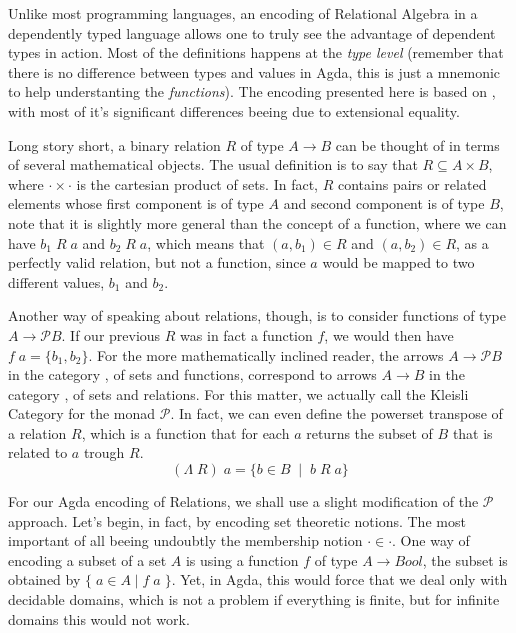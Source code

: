 Unlike most programming languages, an encoding of Relational Algebra in a dependently typed 
language allows one to truly see the advantage of dependent types in action. Most of the definitions
happens at the \emph{type level} (remember that there is no difference between types and values in Agda,
this is just a mnemonic to help understanting the \emph{functions}). The encoding presented
here is based on \cite{Jansson09}, with most of it's significant differences beeing due to
extensional equality.

Long story short, a binary relation $R$ of type $A \rightarrow B$ can be thought of in terms of several mathematical objects.
The usual definition is to say that $R \subseteq A \times B$, where $\cdot\times\cdot$ is the cartesian product of sets.
In fact, $R$ contains pairs or related elements whose first component is of type $A$ and second component is of type $B$,
note that it is slightly more general than the concept of a function, where we can have $b_1\;R\;a$ and $b_2\;R\;a$, which means
that $(a, b_1) \in R$ and $(a, b_2) \in R$, as a perfectly valid relation, but not a function, since $a$ would be mapped to two different values, $b_1$ and $b_2$.

\newcommand{\powerset}{\mathcal{P}}
Another way of speaking about relations, though, is to consider functions of type $A \rightarrow \powerset B$.
If our previous $R$ was in fact a function $f$, we would then have $f\; a = \{b_1, b_2\}$. For the more
mathematically inclined reader, the arrows $A \rightarrow \powerset B$ in the category , of sets and
functions, correspond to arrows $A \rightarrow B$ in the category , of sets and relations. For this matter,
we actually call  the Kleisli Category for the monad $\powerset$. 
In fact, we can even define the powerset transpose of a relation $R$, which is a function that for each $a$
returns the subset of $B$ that is related to $a$ trough $R$.
\[ (\Lambda\; R)\; a = \{ b \in B \;\mid\; b\;R\;a \} \]

For our Agda encoding of Relations, we shall use a slight modification of the $\powerset$ approach.
Let's begin, in fact, by encoding set theoretic notions. The most important of all beeing undoubtly
the membership notion $\cdot \in \cdot$. One way of encoding a subset of a set $A$ is using a function $f$
of type $A \rightarrow Bool$, the subset is obtained by $\{\; a \in A\; |\; f\;a\; \}$. Yet, in Agda, this would
force that we deal only with decidable domains, which is not a problem if everything is finite, but
for infinite domains this would not work.

